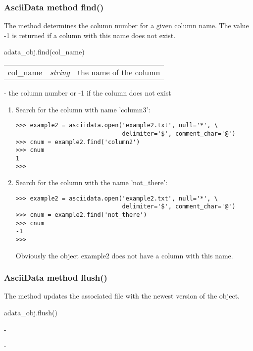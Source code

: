 \subsubsection{AsciiData method find()}
\label{adm_find}
The method determines the column number for a given column name.
The value -1 is returned if a column with this name does not exist.

adata\_obj.find(col\_name)

\begin{tabular}{lcl}
col\_name &{\it string}& the name of the column\\
\end{tabular}

- the column number or -1 if the column does not exist

\begin{enumerate}
\item Search for the column with name 'column3':
\begin{verbatim}
>>> example2 = asciidata.open('example2.txt', null='*', \
                              delimiter='$', comment_char='@')
>>> cnum = example2.find('column2')
>>> cnum
1
>>>
\end{verbatim}
\item Search for the column with the name 'not\_there':
\begin{verbatim}
>>> example2 = asciidata.open('example2.txt', null='*', \
                              delimiter='$', comment_char='@')
>>> cnum = example2.find('not_there')
>>> cnum
-1
>>>
\end{verbatim}
Obviously the \ad object example2 does not have a column with this name.
\end{enumerate}

\subsubsection{AsciiData method flush()}
\label{adm_flush}
\index{flush()}
The method updates the associated file with the newest version of the
\ad object.

adata\_obj.flush()

-

-

